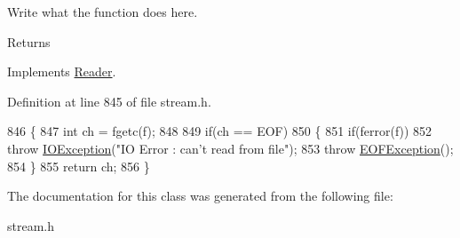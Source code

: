 Write what the function does here. 

\begin{DoxyReturn}{Returns}

\end{DoxyReturn}


Implements \hyperlink{classReader}{Reader}.



Definition at line 845 of file stream.\+h.


\begin{DoxyCode}
846         \{
847             \textcolor{keywordtype}{int} ch = fgetc(f);
848 
849             \textcolor{keywordflow}{if}(ch == EOF)
850             \{
851                 \textcolor{keywordflow}{if}(ferror(f))
852                     \textcolor{keywordflow}{throw} \hyperlink{classIOException}{IOException}(\textcolor{stringliteral}{"IO Error : can't read from file"});
853                 \textcolor{keywordflow}{throw} \hyperlink{classEOFException}{EOFException}();
854             \}
855             \textcolor{keywordflow}{return} ch;
856         \}
\end{DoxyCode}


The documentation for this class was generated from the following file\+:\begin{DoxyCompactItemize}
\item 
stream.\+h\end{DoxyCompactItemize}
